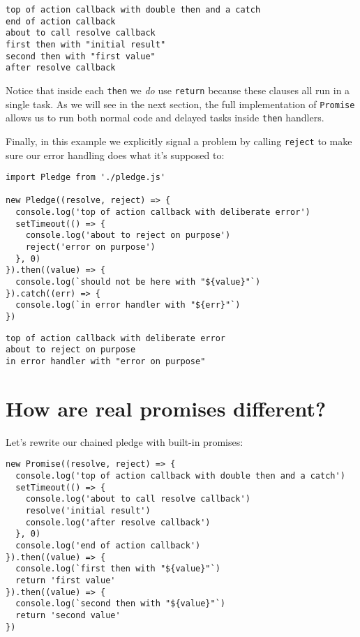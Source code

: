 \documentclass[krantzl]{krantz}
\begin{document}
\begin{lstlisting}[frame=single,frameround=tttt]
top of action callback with double then and a catch
end of action callback
about to call resolve callback
first then with "initial result"
second then with "first value"
after resolve callback
\end{lstlisting}



\noindent Notice that inside each \texttt{then} we \emph{do} use \texttt{return}
because these clauses all run in a single task.
As we will see in the next section,
the full implementation of \texttt{Promise} allows us to run both normal code
and delayed tasks inside \texttt{then} handlers.


Finally,
in this example we explicitly signal a problem by calling \texttt{reject}
to make sure our error handling does what it's supposed to:


\begin{lstlisting}[frame=single,frameround=tttt]
import Pledge from './pledge.js'

new Pledge((resolve, reject) => {
  console.log('top of action callback with deliberate error')
  setTimeout(() => {
    console.log('about to reject on purpose')
    reject('error on purpose')
  }, 0)
}).then((value) => {
  console.log(`should not be here with "${value}"`)
}).catch((err) => {
  console.log(`in error handler with "${err}"`)
})
\end{lstlisting}



\begin{lstlisting}[frame=single,frameround=tttt]
top of action callback with deliberate error
about to reject on purpose
in error handler with "error on purpose"
\end{lstlisting}


\section{How are real promises different?}\label{async-programming-real}


Let's rewrite our chained pledge with built-in promises:


\begin{lstlisting}[frame=single,frameround=tttt]
new Promise((resolve, reject) => {
  console.log('top of action callback with double then and a catch')
  setTimeout(() => {
    console.log('about to call resolve callback')
    resolve('initial result')
    console.log('after resolve callback')
  }, 0)
  console.log('end of action callback')
}).then((value) => {
  console.log(`first then with "${value}"`)
  return 'first value'
}).then((value) => {
  console.log(`second then with "${value}"`)
  return 'second value'
})
\end{lstlisting}
\end{document}
